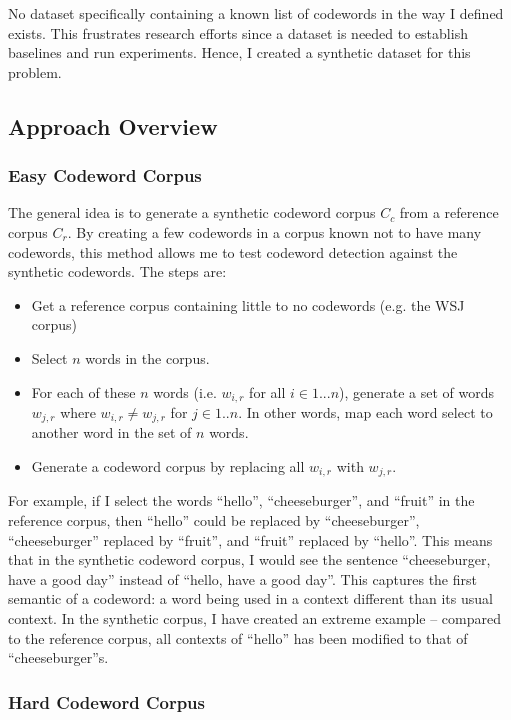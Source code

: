 No dataset specifically containing a known list of codewords in the way I defined exists. This frustrates research efforts since a dataset is needed to establish baselines and run experiments. Hence, I created a synthetic dataset for this problem.

\subsection{Approach Overview}

\subsubsection{Easy Codeword Corpus}

The general idea is to generate a synthetic codeword corpus $C_c$ from a reference corpus $C_r$. By creating a few codewords in a corpus known not to have many codewords, this method allows me to test codeword detection against the synthetic codewords. The steps are:

\begin{itemize}
\item Get a reference corpus containing little to no codewords (e.g. the WSJ corpus)
\item Select $n$ words in the corpus.
\item For each of these $n$ words (i.e. $w_{i, r}$ for all $i \in 1 ... n$), generate a set of words $w_{j, r}$ where $w_{i, r} \neq w_{j, r}$ for $j \in 1 .. n$. In other words, map each word select to another word in the set of $n$ words.
\item Generate a codeword corpus by replacing all $w_{i, r}$ with $w_{j, r}$.
\end{itemize}

For example, if I select the words ``hello'', ``cheeseburger'', and ``fruit'' in the reference corpus, then ``hello'' could be replaced by ``cheeseburger'', ``cheeseburger'' replaced by ``fruit'', and ``fruit'' replaced by ``hello''. This means that in the synthetic codeword corpus, I would see the sentence ``cheeseburger, have a good day'' instead of ``hello, have a good day''. This captures the first semantic of a codeword: a word being used in a context different than its usual context. In the synthetic corpus, I have created an extreme example -- compared to the reference corpus, all contexts of ``hello'' has been modified to that of ``cheeseburger''s.

\subsubsection{Hard Codeword Corpus}

